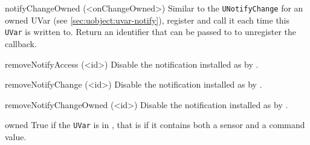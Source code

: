 \begin{urbiscriptapi}
\item[notifyChangeOwned](<onChangeOwned>)%
  Similar to the \Cxx \lstinline|UNotifyChange| for an owned UVar (see
  \autoref{sec:uobject:uvar-notify}), register  and call it
  each time this \lstinline|UVar| is written to.  Return an identifier that
  can be passed to  to unregister the
  callback.

\item[removeNotifyAccess](<id>)%
  Disable the notification installed as  by .

\item[removeNotifyChange](<id>)%
  Disable the notification installed as  by .

\item[removeNotifyChangeOwned](<id>)%
  Disable the notification installed as  by
  .

\item[owned]%
  True if the \lstinline|UVar| is in , that is if it
  contains both a sensor and a command value.

\end{urbiscriptapi}

